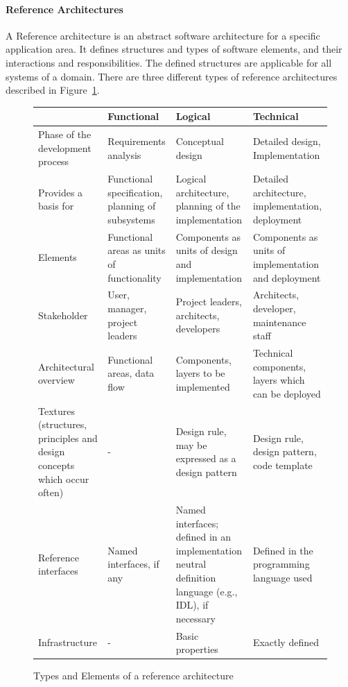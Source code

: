 \paragraph{Reference Architectures}
A Reference architecture is an abstract software architecture for a specific application area. It defines structures and types of software elements, and their interactions and responsibilities. The defined structures are applicable for all systems of a domain.
There are three different types of reference architectures described in Figure~\ref{fig:reference_architectures}.
\begin{figure}[h]
  \centering
  \begin{tabular}{|p{}|p{}|p{}|p{}|}
    \hline
    & Functional & Logical & Technical\\
    \hline
    Phase of the development process & Requirements analysis & Conceptual design & Detailed design, Implementation\\
    \hline
    Provides a basis for & Functional specification, planning of subsystems & Logical architecture, planning of the implementation & Detailed architecture, implementation, deployment\\
    \hline
    Elements & Functional areas as units of functionality & Components as units of design and implementation & Components as units of implementation and deployment\\
    \hline
    Stakeholder & User, manager, project leaders & Project leaders, architects, developers & Architects, developer, maintenance staff\\
    \hline
    Architectural overview & Functional areas, data flow & Components, layers to be implemented & Technical components, layers which can be deployed\\
    \hline
    Textures (structures, principles and design concepts which occur often) & - & Design rule, may be expressed as a design pattern & Design rule, design pattern, code template\\
    \hline
    Reference interfaces & Named interfaces, if any & Named interfaces; defined in an implementation neutral definition language (e.g., IDL), if necessary & Defined in the programming language used\\
    \hline
    Infrastructure & - & Basic properties & Exactly defined\\
    \hline
  \end{tabular}
  \caption{Types and Elements of a reference architecture}\label{fig:reference_architectures}
\end{figure}

